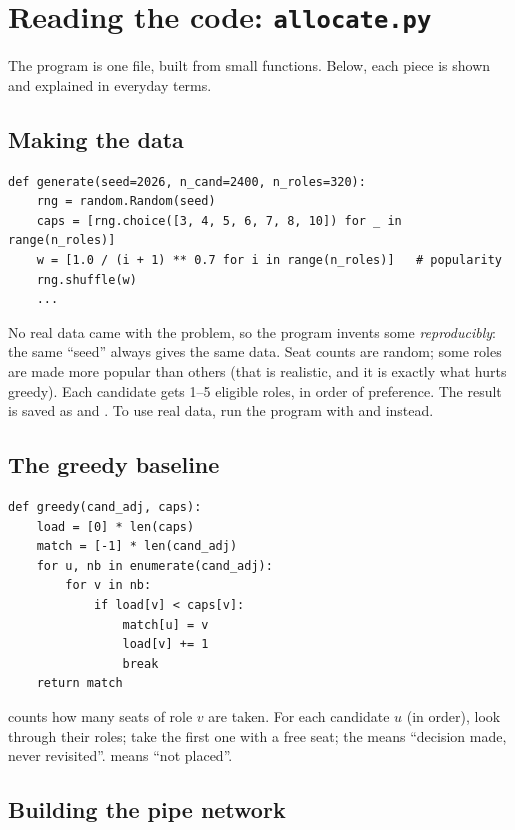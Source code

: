 \documentclass[11pt]{article}
\begin{document}
\section{Reading the code: \texttt{allocate.py}}

The program is one file, built from small functions. Below, each piece is shown and explained in everyday terms.

\subsection{Making the data}

\begin{lstlisting}
def generate(seed=2026, n_cand=2400, n_roles=320):
    rng = random.Random(seed)
    caps = [rng.choice([3, 4, 5, 6, 7, 8, 10]) for _ in range(n_roles)]
    w = [1.0 / (i + 1) ** 0.7 for i in range(n_roles)]   # popularity
    rng.shuffle(w)
    ...
\end{lstlisting}
No real data came with the problem, so the program invents some \emph{reproducibly}: the same ``seed'' always gives the same data. Seat counts are random; some roles are made more popular than others (that is realistic, and it is exactly what hurts greedy). Each candidate gets 1--5 eligible roles, in order of preference. The result is saved as  and . To use real data, run the program with  and  instead.

\subsection{The greedy baseline}

\begin{lstlisting}
def greedy(cand_adj, caps):
    load = [0] * len(caps)
    match = [-1] * len(cand_adj)
    for u, nb in enumerate(cand_adj):
        for v in nb:
            if load[v] < caps[v]:
                match[u] = v
                load[v] += 1
                break
    return match
\end{lstlisting}
 counts how many seats of role $v$ are taken. For each candidate $u$ (in order), look through their roles; take the first one with a free seat; the  means ``decision made, never revisited''.  means ``not placed''.

\subsection{Building the pipe network}
\end{document}
